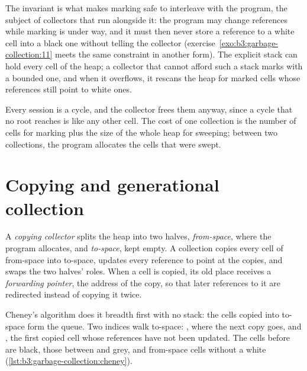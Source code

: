 The invariant is what makes marking safe to interleave with the program, the subject of collectors that run alongside it: the program may change references while marking is under way, and it must then never store a reference to a white cell into a black one without telling the collector (exercise~\ref{exo:b3:garbage-collection:11} meets the same constraint in another form). The explicit stack can hold every cell of the heap; a collector that cannot afford such a stack marks with a bounded one, and when it overflows, it rescans the heap for marked cells whose references still point to white ones.

\label{out:b3:garbage-collection:ms}

Every session is a cycle, and the collector frees them anyway, since a cycle that no root reaches is  like any other cell. The cost of one collection is the number of  cells for marking plus the size of the whole heap for sweeping; between two collections, the program allocates the cells that were swept.

\section{Copying and generational collection}\label{sec:b3:garbage-collection:copying}

\begin{definition}\label{def:b3:garbage-collection:copying}
A \emph{copying collector} splits the heap into two halves, \emph{from-space}, where the program allocates, and \emph{to-space}, kept empty. A collection copies every  cell of from-space into to-space, updates every reference to point at the copies, and swaps the two halves' roles. When a cell is copied, its old place receives a \emph{forwarding pointer}, the address of the copy, so that later references to it are redirected instead of copying it twice.
\end{definition}

Cheney's algorithm does it breadth first with no stack: the cells copied into to-space form the queue. Two indices walk to-space: , where the next copy goes, and , the first copied cell whose references have not been updated. The cells before  are black, those between  and  grey, and from-space cells without a  white (\cref{lst:b3:garbage-collection:cheney}).


